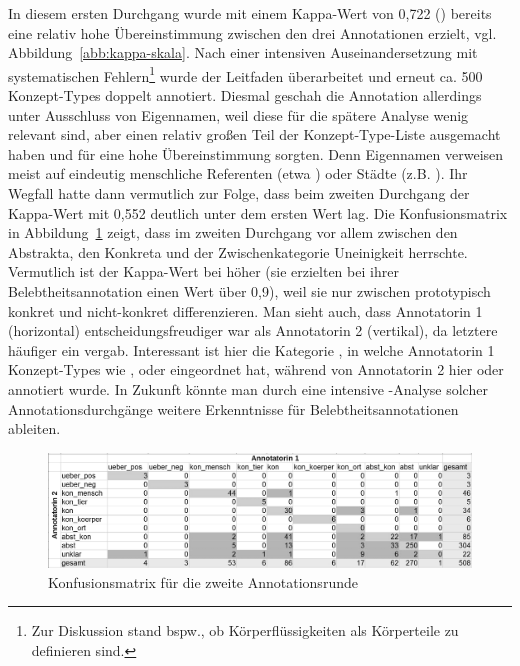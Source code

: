 In diesem ersten Durchgang wurde mit einem Kappa-Wert von 0,722 () bereits eine relativ hohe Übereinstimmung zwischen den drei Annotationen erzielt, vgl. Abbildung~\ref{abb:kappa-skala}. 
Nach einer intensiven Auseinandersetzung mit systematischen Fehlern\footnote{Zur Diskussion stand bspw., ob Körperflüssigkeiten als Körperteile zu definieren sind.} wurde der Leitfaden überarbeitet und erneut ca. 500 Konzept-Types doppelt annotiert. Diesmal geschah die Annotation allerdings unter Ausschluss von Eigennamen, weil diese für die spätere Analyse wenig relevant sind, aber einen relativ großen Teil der Konzept-Type-Liste ausgemacht haben und für eine hohe Übereinstimmung sorgten. Denn Eigennamen verweisen meist auf eindeutig menschliche Referenten (etwa ) oder Städte (z.B. ).
Ihr Wegfall hatte dann vermutlich zur Folge, dass beim zweiten Durchgang der Kappa-Wert mit 0,552 deutlich unter dem ersten Wert lag. 
Die Konfusionsmatrix in Abbildung~\ref{abb:confusion} zeigt, dass im zweiten Durchgang vor allem zwischen den Abstrakta, den Konkreta und der Zwischenkategorie  Uneinigkeit herrschte. 
Vermutlich ist der Kappa-Wert bei \textcite{Zaenen2004} höher (sie erzielten bei ihrer Belebtheitsannotation einen Wert über 0,9), weil sie nur zwischen prototypisch konkret und nicht-konkret differenzieren. Man sieht auch, dass Annotatorin 1 (horizontal) entscheidungsfreudiger war als Annotatorin 2 (vertikal), da letztere häufiger ein  vergab. Interessant ist hier die Kategorie , in welche Annotatorin 1 Konzept-Types wie ,  oder  eingeordnet hat, während von Annotatorin 2 hier  oder  annotiert wurde. In Zukunft könnte man durch eine intensive -Analyse solcher Annotationsdurchgänge weitere Erkenntnisse für Belebtheitsannotationen ableiten.  
 
\begin{figure}
\begin{center}
  \includegraphics[width=12 cm]{images/confusionsmatrix-neu-sw.jpg}
\caption {Konfusionsmatrix für die zweite Annotationsrunde}
\label{abb:confusion}
\end{center}
\end{figure} 

